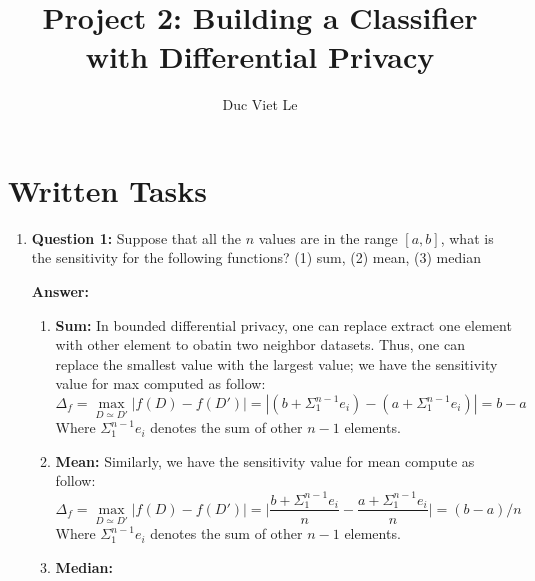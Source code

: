 \documentclass{article}
\title{Project 2: Building a Classifier with Differential Privacy}
\author{Duc Viet Le}
\newcommand{\ans}[1]{\begin{mdframed}\textbf{Answer: }#1\end{mdframed}}
\begin{document}
\maketitle
\section{Written Tasks}
\begin{enumerate}
    \item[]\textbf{Question 1:} Suppose that all the $n$ values are in the range $[a, b]$, what is the sensitivity for the following functions? (1) sum, (2) mean, (3) median
    \ans{
	\begin{enumerate}
    \item 
    \textbf{Sum:} In bounded differential privacy, one can replace extract one element with other element to obatin two neighbor datasets. 
    Thus, one can replace the smallest value with the largest value; 
    we have the sensitivity value for max computed as follow: 
        \begin{equation}
			\Delta_f  = \max_{D\simeq D'} |f(D) - f(D')| =|(b+\Sigma_{1}^{n-1}e_i)-(a+\Sigma_{1}^{n-1}e_i)| =  b-a
        \end{equation}
        Where $\Sigma_{1}^{n-1}e_i$ denotes the sum of other $n-1$ elements.

    \item \textbf{Mean:} Similarly, we have the sensitivity value for mean compute as follow: 
        \begin{equation}
			\Delta_f  = \max_{D\simeq D'} |f(D) - f(D')| = \bigg|\frac{b+\Sigma_{1}^{n-1}e_i}{n} - \frac{a+\Sigma_{1}^{n-1}e_i}{n}\bigg|= (b-a)/n
        \end{equation}
        Where $\Sigma_{1}^{n-1}e_i$ denotes the sum of other $n-1$ elements.
    \item \textbf{Median:}


\end{enumerate}}
\end{enumerate}
\end{document}
